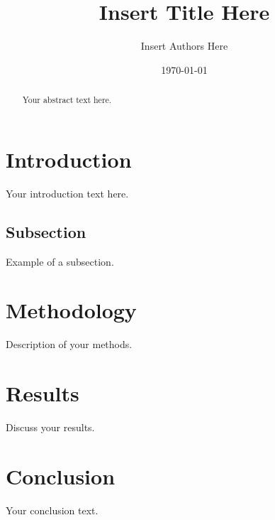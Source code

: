 \documentclass[12pt]{article}
\title{Insert Title Here}
\author{Insert Authors Here}
\date{\today} %
\begin{document}
\maketitle

\begin{abstract}
Your abstract text here.
\end{abstract}

\section{Introduction}
Your introduction text here.

\subsection{Subsection}
Example of a subsection.

\section{Methodology}
Description of your methods.

\section{Results}
Discuss your results.

\section{Conclusion}
Your conclusion text.



\end{document}
